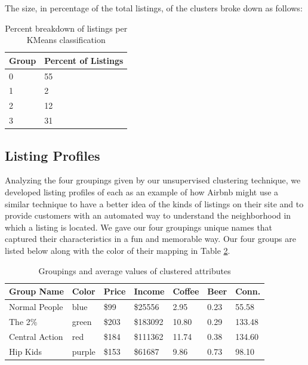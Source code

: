\documentclass[conference]{IEEEtran}
\begin{document}
The size, in percentage of the total listings, of the clusters broke down as follows:

\begin{table}[h]
\caption{Percent breakdown of listings per KMeans classification}
\label{table:percent_listings}
\begin{center}
\begin{tabular}{l|l}
  Group & Percent of Listings\\
  \hline
  \hline
  0 & 55\\
  \hline
  1 & 2\\
  \hline
  2 & 12\\
  \hline
  3 & 31\\
\end{tabular}
\end{center}
\end{table}

\subsection{Listing Profiles}
Analyzing the four groupings given by our unsupervised clustering technique, we developed listing profiles of 
each as an example of how Airbnb might use a similar technique to have a better idea of the kinds of listings on their site
and to provide customers with an automated way to understand the neighborhood in which a listing is located. We gave our four
groupings unique names that captured their characteristics in a fun and memorable way. Our four groups are listed below along
with the color of their mapping in Table \ref{table:groupings}.

\begin{table}[h]
\caption{Groupings and average values of clustered attributes}
\label{table:groupings}
\begin{tabular}{l|l|l|l|l|l|l}
  Group Name & Color & Price & Income & Coffee & Beer & Conn.\\
  \hline
  \hline
  Normal People & blue & \$99 & \$25556 & 2.95 & 0.23 & 55.58\\
  \hline
  The 2\% & green & \$203 & \$183092 & 10.80 & 0.29 & 133.48\\
  \hline
  Central Action & red & \$184 & \$111362 & 11.74 & 0.38 & 134.60\\
  \hline
  Hip Kids & purple & \$153 & \$61687 & 9.86 & 0.73 & 98.10\\
\end{tabular}
\end{table}
\end{document}
